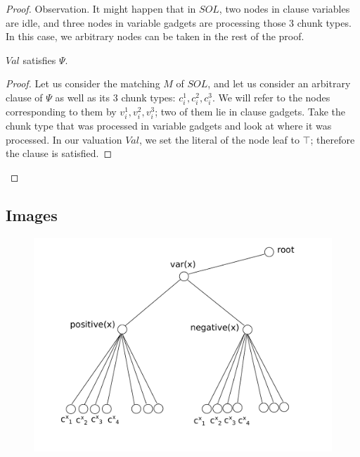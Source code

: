 \documentclass[9pt,twocolumn]{scrartcl}
\newcommand{\achunk}{\ensuremath{c}}
\newcommand{\Formula}{\ensuremath{\Psi}}
\newcommand{\Val}{\ensuremath{Val}}
\newcommand{\Sol}{\ensuremath{SOL}}
\begin{document}
\begin{appendix}
\begin{proof}
Observation. It might happen that in $\Sol$, two nodes in
clause variables are idle, and three nodes in variable gadgets are
processing those $3$ chunk types. In this case, we
arbitrary nodes can be taken in the rest
of the proof.

\begin{lemma}
$\Val$ satisfies $\Formula$.
\end{lemma}
\begin{proof}
Let us consider the matching $M$ of $\Sol$, and let us consider an arbitrary clause of
$\Formula$ as well as its $3$ chunk types: $\achunk_i^1, \achunk_i^2, \achunk_i^3$.
We will refer to the nodes corresponding to them
by $v_i^1, v_i^2, v_i^3$; two of them lie in clause gadgets.
Take the chunk type that was processed in variable
gadgets and look at where it was processed.
In our valuation $\Val$, we set the literal of the node leaf to
$\top$; therefore the clause is satisfied.
\end{proof}
\end{proof}

\subsection{Images}

\begin{figure}[htbp]
\includegraphics[width = \columnwidth]{figs/gadget-no-bw}
\end{figure}



\end{appendix}
\end{document}
